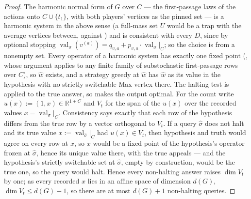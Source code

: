 \documentclass[11pt]{article}
\theoremstyle{plain}
\theoremstyle{definition}
\DeclareMathOperator{\val}{val}
\begin{document}
\begin{proof}
The harmonic normal form of $G$ over $C$ --- the first-passage laws of
the actions onto $C\cup\{t_1\}$,  with both players'
vertices as the pinned set --- is a harmonic system in the above sense
(a full-mass set $U$ would be a trap with the average vertices between,
against ) and is consistent with every $D$, since by
optional stopping $\val_\sigma(v^{(a)})=q_{v,a}+p_{v,a}\cdot\val_\sigma|_C$;
so the choice is from a nonempty set. Every operator of a harmonic system
has exactly one fixed point (, whose argument
applies to any finite family of substochastic first-passage rows over
$C$), so $\hat w$ exists, and a strategy greedy at $\hat w$ has $\hat w$
as its value in the hypothesis with no strictly switchable Max vertex
there. The halting test is applied to the true answer, so
 makes the output optimal. For the count write
$u(x):=(1,x)\in\mathbb R^{1+C}$ and $V_t$ for the span of the $u(x)$ over
the recorded values $x=\val_\sigma|_C$. Consistency says exactly that
each row of the hypothesis differs from the true row by a vector
orthogonal to $V_t$. If a query $\hat\sigma$ does not halt and its true
value $x:=\val_{\hat\sigma}|_C$ had $u(x)\in V_t$, then hypothesis and
truth would agree on every row at $x$, so $x$ would be a fixed point of
the hypothesis's operator frozen at $\hat\sigma$, hence its unique value
there, with the true appeals --- and the hypothesis's strictly switchable
set at $\hat\sigma$, empty by construction, would be the true one, so the
query would halt. Hence every non-halting answer raises $\dim V_t$ by
one; as every recorded $x$ lies in an affine space of dimension $d(G)$,
$\dim V_t\le d(G)+1$, so there are at most $d(G)+1$ non-halting queries.
\end{proof}
\end{document}
